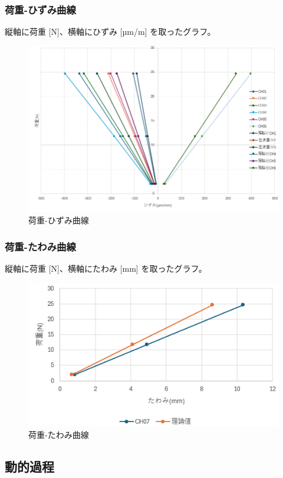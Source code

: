 \documentclass[a4j]{jarticle}
\begin{document}
\subsubsection{荷重-ひずみ曲線}
縦軸に荷重 [N]、横軸にひずみ [µm/m] を取ったグラフ。
\begin{figure}[H]
    \centering
    \includegraphics[width=0.8\linewidth]{summer/ship-experiment/bend/picture/kaju-hizumi.png}
    \caption{荷重-ひずみ曲線}
    \label{fig:kaju-hizumi}
\end{figure}

\subsubsection{荷重-たわみ曲線}
縦軸に荷重 [N]、横軸にたわみ [mm] を取ったグラフ。
\begin{figure}[H]
    \centering
    \includegraphics[width=0.8\linewidth]{summer/ship-experiment/bend/picture/kaju-tawami.png}
    \caption{荷重-たわみ曲線}
    \label{fig:kaju-tawami}
\end{figure}

\subsection{動的過程}
\end{document}
